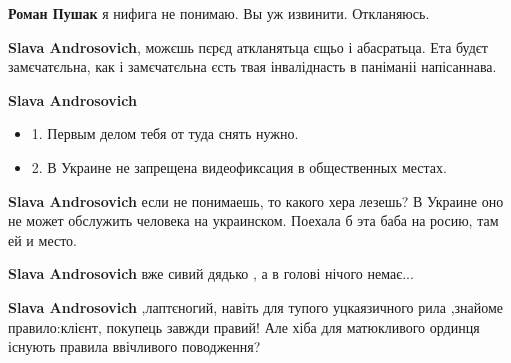 \begin{itemize}
\begin{itemize}
\textbf{Роман Пушак} я нифига не понимаю. Вы уж извинити. Откланяюсь.

 
\textbf{Slava Androsovich}, можєшь пєрєд аткланятьца єщьо і абасратьца. Ета будєт замєчатєльна, как і замєчатєльна єсть твая інваліднасть в паніманіі напісаннава.

 
\textbf{Slava Androsovich} 

\begin{itemize}
  \item 1. Первым делом тебя от туда снять нужно.
  \item 2. В Украине не запрещена видеофиксация в общественных местах.
\end{itemize}


 
\textbf{Slava Androsovich} если не понимаешь, то какого хера лезешь? В Украине оно не может обслужить человека на украинском. Поехала б эта баба на росию, там ей и место.

 
\textbf{Slava Androsovich} вже сивий дядько , а в голові нічого немає...

 
\textbf{Slava Androsovich} ,лаптєногий, навіть для тупого уцкаязичного рила
,знайоме правило:клієнт, покупець завжди правий! Але хіба для матюкливого
ординця існують правила ввічливого поводження?


\end{itemize}
\end{itemize}
